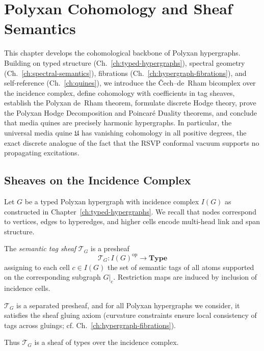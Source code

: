 \chapter{Polyxan Cohomology and Sheaf Semantics}
\label{ch:polyxan-cohomology}

This chapter develops the cohomological backbone of Polyxan hypergraphs.
Building on typed structure (Ch.~\ref{ch:typed-hypergraphs}),
spectral geometry (Ch.~\ref{ch:spectral-semantics}),
fibrations (Ch.~\ref{ch:hypergraph-fibrations}),
and self-reference (Ch.~\ref{ch:quines}),
we introduce the Čech--de~Rham bicomplex over the incidence complex,
define cohomology with coefficients in tag sheaves, establish the Polyxan
de~Rham theorem, formulate discrete Hodge theory, prove the Polyxan Hodge
Decomposition and Poincaré Duality theorems, and conclude that media quines
are precisely harmonic hypergraphs.  
In particular, the universal media quine $\mathfrak{U}$ has vanishing
cohomology in all positive degrees, the exact discrete analogue of the fact
that the RSVP conformal vacuum supports no propagating excitations.

\section{Sheaves on the Incidence Complex}

Let $G$ be a typed Polyxan hypergraph with incidence complex $I(G)$
as constructed in Chapter~\ref{ch:typed-hypergraphs}.
We recall that nodes correspond to vertices, edges to hyperedges, and higher
cells encode multi-head link and span structure.

\begin{definition}
The \emph{semantic tag sheaf} $\mathscr{T}_G$ is a presheaf
\[
\mathscr{T}_G : I(G)^{\mathrm{op}} \longrightarrow \mathbf{Type}
\]
assigning to each cell $c\in I(G)$ the set of semantic tags of all atoms
supported on the corresponding subgraph $G|_c$.
Restriction maps are induced by inclusion of incidence cells.
\end{definition}

$\mathscr{T}_G$ is a separated presheaf, and for all Polyxan hypergraphs we
consider, it satisfies the sheaf gluing axiom (curvature constraints ensure
local consistency of tags across gluings; cf. Ch.~\ref{ch:hypergraph-fibrations}).

Thus $\mathscr{T}_G$ is a sheaf of types over the incidence complex.


